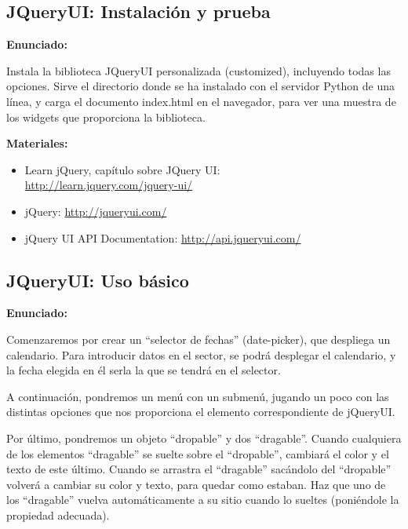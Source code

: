 \subsection{JQueryUI: Instalación y prueba}
\label{subsec:otras-jquery-instal}

\textbf{Enunciado:}

Instala la biblioteca JQueryUI personalizada (customized), incluyendo todas las opciones. Sirve el directorio donde se ha instalado con el servidor Python de una línea, y carga el documento index.html en el navegador, para ver una muestra de los widgets que proporciona la biblioteca.

\textbf{Materiales:}

\begin{itemize}
\item Learn jQuery, capítulo sobre JQuery UI: \\
  \url{http://learn.jquery.com/jquery-ui/}
\item jQuery: \url{http://jqueryui.com/}
\item jQuery UI API Documentation: \url{http://api.jqueryui.com/}
\end{itemize}

\subsection{JQueryUI: Uso básico}
\label{subsec:otras-jquery-basico}

\textbf{Enunciado:}

Comenzaremos por crear un ``selector de fechas'' (date-picker), que despliega un calendario. Para introducir datos en el sector, se podrá desplegar el calendario, y la fecha elegida en él serla la que se tendrá en el selector.

A continuación, pondremos un menú con un submenú, jugando un poco con las distintas opciones que nos proporciona el elemento correspondiente de jQueryUI.

Por último, pondremos un objeto ``dropable'' y dos ``dragable''. Cuando cualquiera de los elementos ``dragable'' se suelte sobre el ``dropable'', cambiará el color y el texto de este último. Cuando se arrastra el ``dragable'' sacándolo del ``dropable'' volverá a cambiar su color y texto, para quedar como estaban. Haz que uno de los ``dragable'' vuelva automáticamente a su sitio cuando lo sueltes (poniéndole la propiedad adecuada).

